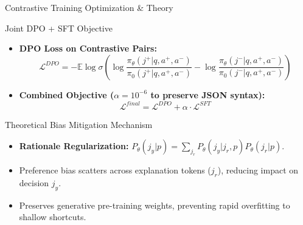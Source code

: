 \documentclass[10pt]{beamer}
\begin{document}
\begin{frame}{Contrastive Training Optimization \& Theory}
\begin{block}{Joint DPO + SFT Objective}
    \begin{itemize}
        \item \textbf{DPO Loss on Contrastive Pairs:}
        $$\mathcal{L}^{DPO} = -\mathbb{E} \log \sigma \left( \log \frac{\pi_\theta(j^+|q,a^+,a^-)}{\pi_0(j^+|q,a^+,a^-)} - \log \frac{\pi_\theta(j^-|q,a^+,a^-)}{\pi_0(j^-|q,a^+,a^-)} \right)$$
        \item \textbf{Combined Objective ($\alpha = 10^{-6}$ to preserve JSON syntax):}
        $$\mathcal{L}^{final} = \mathcal{L}^{DPO} + \alpha \cdot \mathcal{L}^{SFT}$$
    \end{itemize}
\end{block}

\begin{block}{Theoretical Bias Mitigation Mechanism}
    \begin{itemize}
        \item \textbf{Rationale Regularization:} $P_\theta(j_y|p) = \sum_{j_r} P_\theta(j_y|j_r,p) P_\theta(j_r|p)$.
        \item Preference bias scatters across explanation tokens ($j_r$), reducing impact on decision $j_y$.
        \item Preserves generative pre-training weights, preventing rapid overfitting to shallow shortcuts.
    \end{itemize}
\end{block}
\end{frame}
\end{document}
